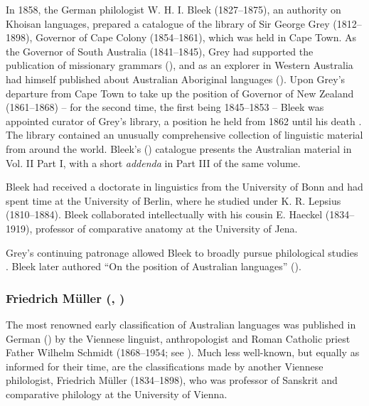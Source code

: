In 1858, the German philologist W. H. I. Bleek (1827--1875), an authority on Khoi\-san languages, prepared a catalogue of the library of Sir George Grey (1812--1898), Governor of Cape Colony (1854--1861), which was held in Cape Town. As the Governor of South Australia (1841--1845), Grey had supported the publication of missionary grammars (), and as an explorer in Western Australia had himself published about Australian Aboriginal languages (\citeyear{grey_vocabulary_1839}). Upon Grey’s departure from Cape Town to take up the position of Governor of New Zealand (1861--1868) – for the second time, the first being 1845--1853 – Bleek was appointed curator of Grey’s library, a position he held from 1862 until his death \citep{gregorio_reflections_2002}. The library contained an unusually comprehensive collection of linguistic material from around the world. Bleek’s (\citeyear{bleek_library_1858}) catalogue presents the Australian material in Vol. II Part I, with a short \textit{addenda} in Part III of the same volume.

Bleek had received a doctorate in linguistics from the University of Bonn and had spent time at the University of Berlin, where he studied under K. R. Lepsius (1810--1884). Bleek collaborated intellectually with his cousin E. Haeckel (1834--1919), professor of comparative anatomy at the University of Jena.

\hspace*{-0.8pt}Grey’s continuing patronage allowed Bleek to broadly pursue philological studies \citep[170]{gilmour_grammars_2006}. Bleek later authored “On the position of Australian languages” (\citeyear{bleek_position_1872}).

\subsubsection{Friedrich Müller (\citeyear{muller_reise_1867}, \citeyear{muller_grundris_1882})}
\label{sec:key:1.1.4.2}

The most renowned early classification of Australian languages was published in German (\citeyear{schmidt_gliederung_1919}) by the Viennese linguist, anthropologist and Roman Catholic priest Father Wilhelm Schmidt (1868--1954; see \citealt[18--25]{koch_methodological_2004}). Much less well-known, but equally as informed for their time, are the classifications made by another Viennese philologist, Friedrich Müller (1834--1898), who was professor of Sanskrit and comparative philology at the University of Vienna. 


